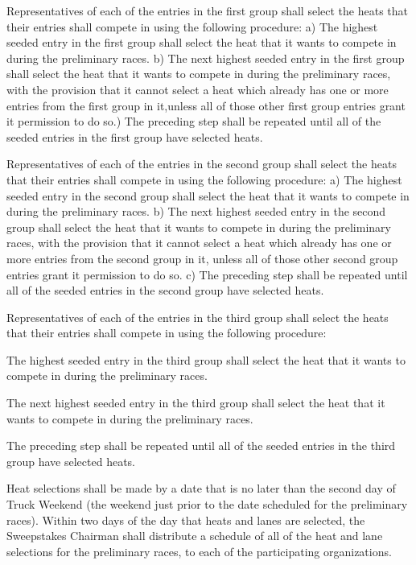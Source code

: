 Representatives of each of the entries in the first group shall select the heats that their entries shall compete in using the following procedure: a) The highest seeded entry in the first group shall select the heat that it wants to compete in during the preliminary races. b) The next highest seeded entry in the first group shall select the heat that it wants to compete in during the preliminary races, with the provision that it cannot select a heat which already has one or more entries from the first group in it,unless all of those other first group entries grant it permission to do so.) The preceding step shall be repeated until all of the seeded entries in the first group have selected heats.

Representatives of each of the entries in the second group shall select the heats that their entries shall compete in using the following procedure: a) The highest seeded entry in the second group shall select the heat that it wants to compete in during the preliminary races. b) The next highest seeded entry in the second group shall select the heat that it wants to compete in during the preliminary races, with the provision that it cannot select a heat which already has one or more entries from the second group in it, unless all of those other second group entries grant it permission to do so. c) The preceding step shall be repeated until all of the seeded entries in the second group have selected heats.

Representatives of each of the entries in the third group shall select the heats that their entries shall compete in using the following procedure:

The highest seeded entry in the third group shall select the heat that it wants to compete in during the preliminary races.

The next highest seeded entry in the third group shall select the heat that it wants to compete in during the preliminary races.

The preceding step shall be repeated until all of the seeded entries in the third group have selected heats.

Heat selections shall be made by a date that is no later than the second day of Truck Weekend (the weekend just prior to the date scheduled for the preliminary races). Within two days of the day that heats and lanes are selected, the Sweepstakes Chairman shall distribute a schedule of all of the heat and lane selections for the preliminary races, to each of the participating organizations.

